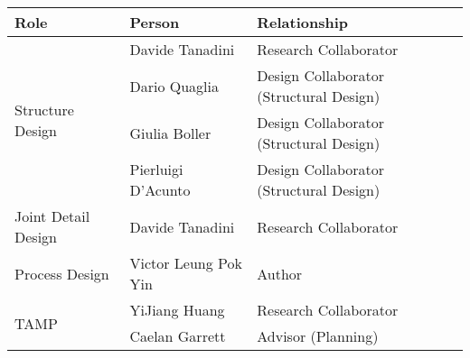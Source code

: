 \begin{table}[H]
\begin{adjustbox}{max width=\textwidth}
\begin{tabular}{p{3.49cm}p{3.79cm}p{8.59cm}}
\hline
\multicolumn{1}{|p{3.49cm}}{{\footnotesize \textbf{Role}}} & 
\multicolumn{1}{|p{3.79cm}}{{\footnotesize \textbf{Person}}} & 
\multicolumn{1}{|p{8.59cm}|}{{\footnotesize \textbf{Relationship}}} \\ 
\hline
\multicolumn{1}{|p{3.49cm}}{\multirow{4}{*}{\parbox{3.49cm}{{\footnotesize Structure Design}}}} & 
\multicolumn{1}{|p{3.79cm}}{{\footnotesize Davide Tanadini}} & 
\multicolumn{1}{|p{8.59cm}|}{{\footnotesize Research Collaborator}} \\ 
\hhline{~--}
\multicolumn{1}{|p{3.49cm}}{} & 
\multicolumn{1}{|p{3.79cm}}{{\footnotesize Dario Quaglia}} & 
\multicolumn{1}{|p{8.59cm}|}{{\footnotesize Design Collaborator (Structural Design)}} \\ 
\hhline{~--}
\multicolumn{1}{|p{3.49cm}}{} & 
\multicolumn{1}{|p{3.79cm}}{{\footnotesize Giulia Boller}} & 
\multicolumn{1}{|p{8.59cm}|}{{\footnotesize Design Collaborator (Structural Design)}} \\ 
\hhline{~--}
\multicolumn{1}{|p{3.49cm}}{} & 
\multicolumn{1}{|p{3.79cm}}{{\footnotesize Pierluigi D’Acunto}} & 
\multicolumn{1}{|p{8.59cm}|}{{\footnotesize Design Collaborator (Structural Design)}} \\ 
\hline
\multicolumn{1}{|p{3.49cm}}{{\footnotesize Joint Detail Design}} & 
\multicolumn{1}{|p{3.79cm}}{{\footnotesize Davide Tanadini}} & 
\multicolumn{1}{|p{8.59cm}|}{{\footnotesize Research Collaborator}} \\ 
\hline
\multicolumn{1}{|p{3.49cm}}{{\footnotesize Process Design}} & 
\multicolumn{1}{|p{3.79cm}}{{\footnotesize Victor Leung Pok Yin}} & 
\multicolumn{1}{|p{8.59cm}|}{{\footnotesize Author}} \\ 
\hline
\multicolumn{1}{|p{3.49cm}}{\multirow{2}{*}{\parbox{3.49cm}{{\footnotesize TAMP}}}} & 
\multicolumn{1}{|p{3.79cm}}{{\footnotesize YiJiang Huang}} & 
\multicolumn{1}{|p{8.59cm}|}{{\footnotesize Research Collaborator}} \\ 
\hhline{~--}
\multicolumn{1}{|p{3.49cm}}{} & 
\multicolumn{1}{|p{3.79cm}}{{\footnotesize Caelan Garrett}} & 
\multicolumn{1}{|p{8.59cm}|}{{\footnotesize Advisor (Planning)}} \\ 
\hline
\end{tabular}
\end{adjustbox}
\end{table}
